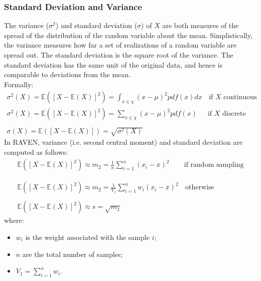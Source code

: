 \subsubsection{Standard Deviation and Variance}
The variance ($\sigma^{2}$) and standard deviation ($\sigma$) of $X$ are both measures of the spread of the distribution of the random variable about the 
mean. Simplistically, the variance measures how far a set of realizations of a random variable are spread out.
The standard deviation is the square root of the variance. The standard deviation has the same unit of the original data, and hence is comparable to deviations from the mean.
\\Formally:
\begin{equation}
  \begin{matrix}
  \sigma^{2}(X)= \mathbb{E}\left(\left[X - \mathbb{E}(X)\right]^{2}\right) = \int_{x \in \chi} (x - \mu)^2 pdf(x) dx  & \,\text{if $X$ continuous} \\
  \sigma^{2}(X)= \mathbb{E}\left(\left[X - \mathbb{E}(X)\right]^{2}\right)  = \sum_{x \in \chi} (x - \mu)^2 pdf(x)  & \text{if  $X$ discrete}
  \\
  \\ 
  \sigma(X)= \mathbb{E}\left(\left[X - \mathbb{E}(X)\right]\right)  = \sqrt{\sigma^{2}(X)}
  \end{matrix}
\end{equation}
In RAVEN, variance (i.e. second central moment) and standard deviation are computed as follows:
\begin{equation}
\begin{matrix}
\mathbb{E}\left(\left[X - \mathbb{E}(X)\right]^{2}\right)  \approx  m_{2} = \frac{1}{n} \sum_{i=1}^{n}  (x_{i} - \overline{x})^{2} & \text{if  random sampling} \\ 
\\ 
\\
\mathbb{E}\left(\left[X - \mathbb{E}(X)\right]^{2}\right)  \approx m_{2}  = \frac{1}{V_{1}} \sum_{i=1}^{n} w_{i}  (x_{i} - \overline{x})^{2}  & \, \text{otherwise}
\\
\\
\mathbb{E}\left(\left[X - \mathbb{E}(X)\right]^{2}\right)  \approx s  =  \sqrt{m_{2}}
\end{matrix}
\end{equation}
where:
\begin{itemize}
  \item $w_{i}$ is the weight associated with the sample $i$;
  \item $n$ are the total number of samples;
  \item $V_{1} = \sum_{i=1}^{n} w_{i}$.
\end{itemize}
